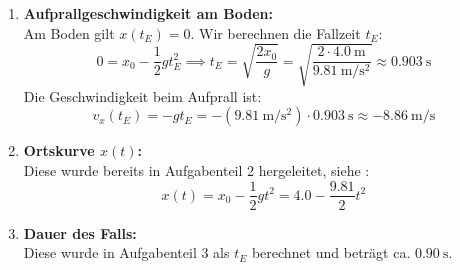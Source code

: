 \documentclass[ngerman]{scrreprt}
\newenvironment{loesungbox}[1]
  {\needspace{5\baselineskip}\begin{loesungboxstyle}[frametitle={#1}]}
  {\end{loesungboxstyle}}
\begin{document}
\begin{loesungbox}{Lösung zu \Cref{aufg:freier_fall}}
\begin{enumerate}
    Die Geschwindigkeit zu diesem Zeitpunkt beträgt laut \cref{eq: freier_fall_v}: 
    \begin{equation}
        v_x(t_V) = -g\cdot t_V =-\left(\SI{9.81}{\meter\per\second\squared}\right) \cdot \SI{0.553}{\second} \approx \SI{-5.42}{\meter\per\second}
    \end{equation}
    
    \item \textbf{Aufprallgeschwindigkeit am Boden:} \\
    Am Boden gilt $x(t_E) = 0$. Wir berechnen die Fallzeit $t_E$: 
    \begin{equation}
        0 = x_0 - \frac{1}{2}g t_E^2 \implies t_E = \sqrt{\frac{2x_0}{g}} = \sqrt{\frac{2 \cdot \SI{4.0}{\meter}}{\SI{9.81}{\meter\per\second\squared}}} \approx \SI{0.903}{\second}
    \end{equation}
    Die Geschwindigkeit beim Aufprall ist:
    \begin{equation}
        v_x(t_E) = -g t_E = -\left(\SI{9.81}{\meter\per\second\squared}\right) \cdot \SI{0.903}{\second} \approx \SI{-8.86}{\meter\per\second}
    \end{equation}
    
    \item \textbf{Ortskurve $x(t)$:} \\
    Diese wurde bereits in Aufgabenteil 2 hergeleitet, siehe :
    \begin{equation}
        x(t) = x_0 - \frac{1}{2}gt^2 = \num{4.0} - \frac{\num{9.81}}{2} t^2
    \end{equation}
    
    \item \textbf{Dauer des Falls:} \\
    Diese wurde in Aufgabenteil 3 als $t_E$ berechnet und beträgt ca. $\SI{0.90}{\second}$. 
\end{enumerate}
\end{loesungbox}
\end{document}
